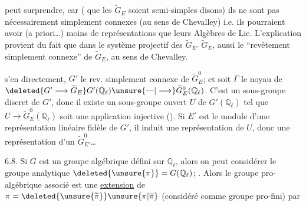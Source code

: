 peut surprendre, car ( que les $\widetilde G_E$ soient semi-simples disons)  ils ne sont pas nécessairement simplement connexes (au sens de Chevalley) i.e. ils pourraient avoir (a priori\ldots) moins de représentations que leurs Algèbres de Lie. L'explication provient du fait que dans le système projectif des $\widetilde G_{E'}$  $\widetilde G_E$,  aussi le ``revêtement simplement connexe'' de $\widetilde G_E$, au sens de Chevalley.

 s'en  directement,   $G'$ le rev. simplement connexe de $\widetilde G_E^0$; et soit $\Gamma$ le noyau de $\deleted{G'\longrightarrow\widetilde G_E}G'(\mathbb Q_\ell)\unsure{\text{---}|\longrightarrow}\widetilde G_E^0(\mathbb Q_\ell)$. C'est un sous-groupe discret de $G'$, donc il existe un sous-groupe ouvert $U$ de $G'(\mathbb Q_\ell)$ tel que $U\longrightarrow\widetilde G_E^0(\mathbb Q_\ell)$ soit une  application injective (). Si $E'$ est le module d'une représentation  linéaire fidèle de $G'$, il induit une représentation  de $U$, donc une représentation d'un $\widetilde G_{E'}^0$\ldots


6.8. Si $G$ est un groupe algébrique  défini sur $\mathbb Q_\ell$, alors on peut considérer le groupe analytique $\deleted{\unsure{\pi}}=G(\mathbb Q_\ell)$; . Alors  le groupe pro-algébrique  associé est une \uline{extension} de $\pi=\deleted{\unsure{\widetilde\pi}}\unsure{\pi|\overline\pi}$ (considéré comme groupe pro-fini) par
